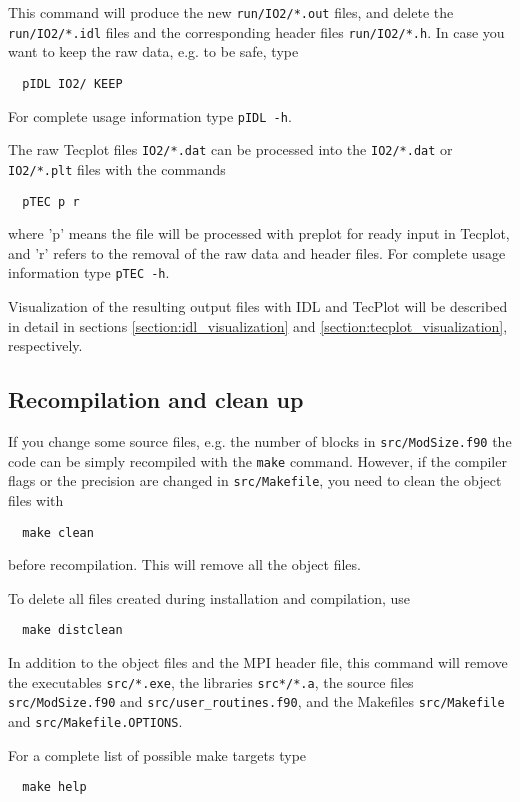 This command will produce the new {\tt run/IO2/*.out}
files, and delete the {\tt run/IO2/*.idl} files
and the corresponding header files {\tt run/IO2/*.h}.
In case you want to keep the raw data, e.g. to be safe, type
\begin{verbatim}
  pIDL IO2/ KEEP
\end{verbatim}
For complete usage information type {\tt pIDL -h}.

The raw Tecplot files {\tt IO2/*.dat} can be processed
into the {\tt IO2/*.dat} or {\tt IO2/*.plt} files
with the commands
\begin{verbatim}
  pTEC p r
\end{verbatim}
where 'p' means the file will be processed with preplot for ready input
in Tecplot, and 'r' refers to the removal of the raw data and header
files.  For complete usage information type {\tt pTEC -h}.

Visualization of the resulting output files with IDL and TecPlot
will be described in detail in sections \ref{section:idl_visualization}
and \ref{section:tecplot_visualization}, respectively.

\subsection{Recompilation and clean up}

If you change some source files, e.g. the number of blocks
in {\tt src/ModSize.f90} the code can be simply recompiled
with the {\tt make} command. However, if the compiler flags or the
precision are changed in {\tt src/Makefile}, you need to clean the
object files with
\begin{verbatim}
  make clean
\end{verbatim}
before recompilation. This will remove all the object files.

To delete all files created during installation and compilation, use
\begin{verbatim}
  make distclean
\end{verbatim}
In addition to the object files and the MPI header file, 
this command will remove the executables {\tt src/*.exe}, 
the libraries {\tt src*/*.a}, the source files
{\tt src/ModSize.f90} and {\tt src/user\_routines.f90}, 
and the Makefiles {\tt src/Makefile} and {\tt src/Makefile.OPTIONS}.

For a complete list of possible make targets type
\begin{verbatim}
  make help
\end{verbatim}
